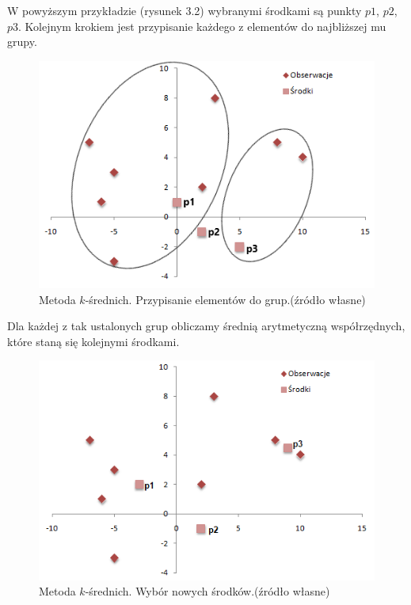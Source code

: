 \documentclass[12pt,a4paper]{report}
\begin{document}
W powyższym przykładzie (rysunek 3.2) wybranymi środkami są punkty $p1$, $p2$, $p3$. Kolejnym krokiem jest przypisanie każdego z elementów do najbliższej mu grupy.
\begin{center}
\begin{figure}[H]
\centering
\includegraphics[scale=0.8]{obrazy/ks_1.png} 
\caption{Metoda $k$-średnich. Przypisanie elementów do grup.(źródło własne)}
\end{figure}
\end{center}
Dla każdej z tak ustalonych grup obliczamy średnią arytmetyczną współrzędnych, które staną się kolejnymi środkami.
\begin{center}
\begin{figure}[H]
\centering
\includegraphics[scale=0.8]{obrazy/ks_2.png} 
\caption{Metoda $k$-średnich. Wybór nowych środków.(źródło własne)}
\end{figure}
\end{center}
\end{document}
